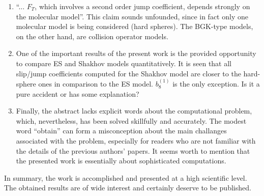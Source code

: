 \documentclass[11pt]{article}
\begin{document}
\begin{enumerate}
    \item ``... \(F_T\), which involves a second order jump coefficient, depends strongly on the molecular model''.
    This claim sounds unfounded, since in fact only one molecular model is being considered (hard spheres).
    The BGK-type models, on the other hand, are collision operator models.

    \item One of the important results of the present work is the provided opportunity
    to compare ES and Shakhov models quantitatively. It is seen that all slip/jump coefficients
    computed for the Shakhov model are closer to the hard-sphere ones in comparison to the ES model.
    \(b_8^{(1)}\) is the only exception. Is it a pure accident or has some explanation?

    \item Finally, the abstract lacks explicit words about the computational problem,
    which, nevertheless, has been solved skillfully and accurately.
    The modest word ``obtain'' can form a misconception about the main challanges associated with the problem,
    especially for readers who are not familiar with the details of the previous authors' papers.
    It seems worth to mention that the presented work is essentially about sophisticated computations.
\end{enumerate}

In summary, the work is accomplished and presented at a high scientific level.
The obtained results are of wide interest and certainly deserve to be published.
\end{document}

